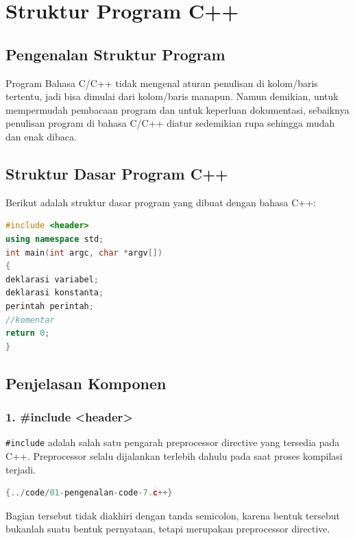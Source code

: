 \section{Struktur Program C++}

\subsection{Pengenalan Struktur Program}

Program Bahasa C/C++ tidak mengenal aturan penulisan di kolom/baris tertentu, jadi bisa dimulai dari kolom/baris manapun. Namun demikian, untuk mempermudah pembacaan program dan untuk keperluan dokumentasi, sebaiknya penulisan program di bahasa C/C++ diatur sedemikian rupa sehingga mudah dan enak dibaca.

\subsection{Struktur Dasar Program C++}

Berikut adalah struktur dasar program yang dibuat dengan bahasa C++:

\begin{lstlisting}[language=c++, caption=Struktur Program C++]
#include <header>
using namespace std;
int main(int argc, char *argv[])
{
deklarasi variabel;
deklarasi konstanta;
perintah perintah;
//komentar
return 0;
}
\end{lstlisting}

\subsection{Penjelasan Komponen}

\subsubsection{1. \#include <header>}

\texttt{\#include} adalah salah satu pengarah preprocessor directive yang tersedia pada C++. Preprocessor selalu dijalankan terlebih dahulu pada saat proses kompilasi terjadi.

\begin{lstlisting}[language=c++]{../code/01-pengenalan-code-7.c++}
\end{lstlisting}

Bagian tersebut tidak diakhiri dengan tanda semicolon, karena bentuk tersebut bukanlah suatu bentuk pernyataan, tetapi merupakan preprocessor directive.

